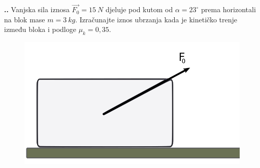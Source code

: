 

\noindent 
\textbf{
\thecjelina.\thezadatak.}
Vanjska sila iznosa $\vec{F_0}=15\ N$ djeluje pod kutom od $\alpha=23 ^\circ$ prema horizontali na blok mase $m=3\ kg$. Izračunajte iznos 
ubrzanja kada je kinetičko trenje između bloka i podloge $\mu_k=0,35$.


\begin{figure}[h]%
  \begin{center}
    \includegraphics[scale=0.29]{03_Dinamika_materijalne_tocke/blok_Zadatak_4_1.png}
  \end{center}
\end{figure}
